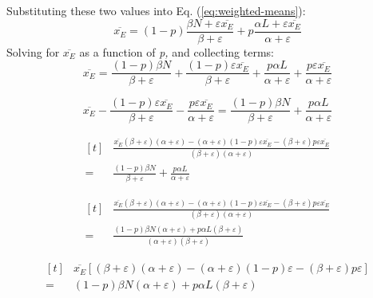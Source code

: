 Substituting these two values into Eq. (\ref{eq:weighted-means}):
\begin{equation}
\overline{x_{E}}=(1-p)\frac{\beta N+\varepsilon\overline{x_{E}}}{\beta+\varepsilon}+p\frac{\alpha L+\varepsilon\overline{x_{E}}}{\alpha+\varepsilon}
\end{equation}
Solving for $\overline{x_{E}}$ as a function of \emph{p, }and collecting
terms:
\begin{equation}
\overline{x_{E}}=\frac{(1-p)\beta N}{\beta+\varepsilon}+\frac{(1-p)\varepsilon\overline{x_{E}}}{\beta+\varepsilon}+\frac{p\alpha L}{\alpha+\varepsilon}+\frac{p\varepsilon\overline{x_{E}}}{\alpha+\varepsilon}
\end{equation}

\begin{equation}
\overline{x_{E}}-\frac{(1-p)\varepsilon\overline{x_{E}}}{\beta+\varepsilon}-\frac{p\varepsilon\overline{x_{E}}}{\alpha+\varepsilon}=\frac{(1-p)\beta N}{\beta+\varepsilon}+\frac{p\alpha L}{\alpha+\varepsilon}
\end{equation}

\begin{equation}
\begin{aligned}[t]
&\frac{\overline{x_{E}}(\beta+\varepsilon)(\alpha+\varepsilon)-(\alpha+\varepsilon)(1-p)\varepsilon\overline{x_{E}}-(\beta+\varepsilon)p\varepsilon\overline{x_{E}}}{(\beta+\varepsilon)(\alpha+\varepsilon)}\\
= &\frac{(1-p)\beta N}{\beta+\varepsilon}+\frac{p\alpha L}{\alpha+\varepsilon}
\end{aligned}
\end{equation}

\begin{equation}
\begin{aligned}[t]
& \frac{\overline{x_{E}}(\beta+\varepsilon)(\alpha+\varepsilon)-(\alpha+\varepsilon)(1-p)\varepsilon\overline{x_{E}}-(\beta+\varepsilon)p\varepsilon\overline{x_{E}}}{(\beta+\varepsilon)(\alpha+\varepsilon)}\\
= & \frac{(1-p)\beta N(\alpha+\varepsilon)+p\alpha L(\beta+\varepsilon)}{(\alpha+\varepsilon)(\beta+\varepsilon)}
\end{aligned}
\end{equation}

\begin{equation}
\begin{aligned}[t]
& \overline{x_{E}}\left[(\beta+\varepsilon)(\alpha+\varepsilon)-(\alpha+\varepsilon)(1-p)\varepsilon-(\beta+\varepsilon)p\varepsilon\right]\\
= & (1-p)\beta N(\alpha+\varepsilon)+p\alpha L(\beta+\varepsilon)
\end{aligned}
\end{equation}

